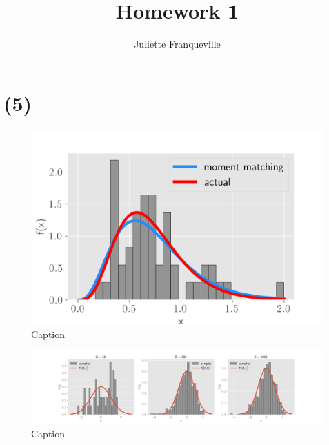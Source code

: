 \documentclass[10pt]{article}
\begin{document}
 
\title{Homework 1}
\author{Juliette Franqueville\\
}
\maketitle
 
\section*{(5)}

\begin{figure}[!h]
    \centering
    \includegraphics[scale=.7]{homework_1/first_hist.png}
    \caption{Caption}
    \label{fig:my_label}
\end{figure}

\begin{figure}[!h]
    \centering
    \includegraphics[scale=.35]{homework_1/second_hist.png}
    \caption{Caption}
    \label{fig:my_label}
\end{figure}
\end{document}
